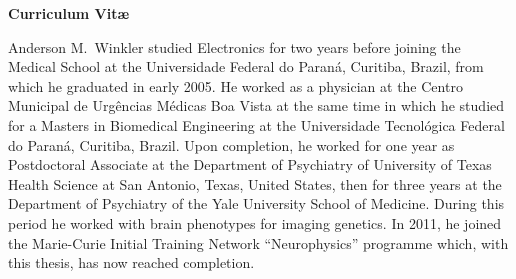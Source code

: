 \cleardoublepage
\setstretch{\lspac}
\vspace*{\fill}
\begin{center}
\begin{Large}
\textbf{Curriculum Vit\ae{}}
\end{Large}
\end{center}

\noindent
Anderson M.\ Winkler studied Electronics for two years before joining the Medical School at the Universidade Federal do Paran\'{a}, Curitiba, Brazil, from which he graduated in early 2005. He worked as a physician at the Centro Municipal de Urg\^{e}ncias M\'{e}dicas Boa Vista at the same time in which he studied for a Masters in Biomedical Engineering at the Universidade Tecnol\'{o}gica Federal do Paran\'{a}, Curitiba, Brazil. Upon completion, he worked for one year as Postdoctoral Associate at the Department of Psychiatry of University of Texas Health Science at San Antonio, Texas, United States, then for three years at the Department of Psychiatry of the Yale University School of Medicine. During this period he worked with brain phenotypes for imaging genetics. In 2011, he joined the Marie-Curie Initial Training Network ``Neurophysics'' programme which, with this thesis, has now reached completion.

\vspace*{\fill}

\cleardoublepage
